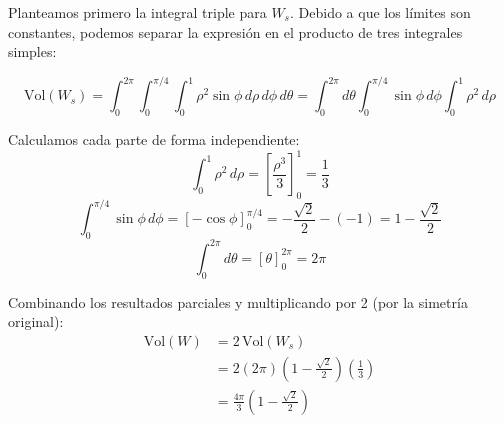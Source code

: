 Planteamos primero la integral triple para $W_s$. Debido a que los límites son constantes, podemos separar la expresión en el producto de tres integrales simples:

\[
    \text{Vol}(W_s) = \int_{0}^{2\pi} \int_{0}^{\pi/4} \int_{0}^{1} \rho^2 \sin \phi \, d\rho \, d\phi \, d\theta = \int_{0}^{2\pi} d\theta \int_{0}^{\pi/4} \sin \phi \, d\phi \int_{0}^{1} \rho^2 \, d\rho
\]

Calculamos cada parte de forma independiente:
\[ \int_{0}^{1} \rho^2 \, d\rho = \left[ \frac{\rho^3}{3} \right]_{0}^{1} = \frac{1}{3} \]
\[ \int_{0}^{\pi/4} \sin \phi \, d\phi = \left[ -\cos \phi \right]_{0}^{\pi/4} = -\frac{\sqrt{2}}{2} - (-1) = 1 - \frac{\sqrt{2}}{2} \]
\[ \int_{0}^{2\pi} d\theta = \left[ \theta \right]_{0}^{2\pi} = 2\pi \]

Combinando los resultados parciales y multiplicando por 2 (por la simetría original):
\begin{align*}
    \text{Vol}(W) &= 2 \, \text{Vol}(W_s) \\
    &= 2 \left( 2\pi \right) \left( 1 - \frac{\sqrt{2}}{2} \right) \left( \frac{1}{3} \right) \\
    &= \frac{4\pi}{3} \left( 1 - \frac{\sqrt{2}}{2} \right)
\end{align*}